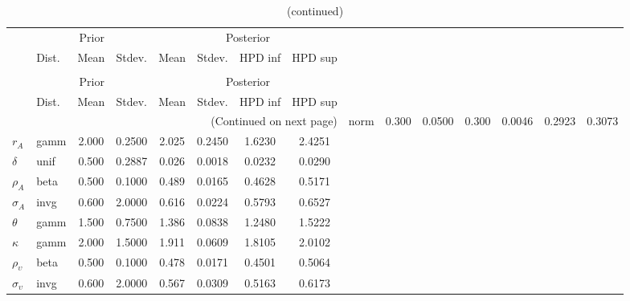  
\begin{center}
\begin{longtable}{llcccccc} 
\caption{Results from Metropolis-Hastings (parameters)}
 \label{Table:MHPosterior:1}\\
\toprule 
  & \multicolumn{3}{c}{Prior}  &  \multicolumn{4}{c}{Posterior} \\
  \cmidrule(r{.75em}){2-4} \cmidrule(r{.75em}){5-8}
  & Dist. & Mean  & Stdev. & Mean & Stdev. & HPD inf & HPD sup\\
\midrule \endfirsthead 
\caption{(continued)}\\\toprule 
  & \multicolumn{3}{c}{Prior}  &  \multicolumn{4}{c}{Posterior} \\
  \cmidrule(r{.75em}){2-4} \cmidrule(r{.75em}){5-8}
  & Dist. & Mean  & Stdev. & Mean & Stdev. & HPD inf & HPD sup\\
\midrule \endhead 
\bottomrule \multicolumn{8}{r}{(Continued on next page)} \endfoot 
\bottomrule \endlastfoot 
${\alpha}$ & norm &   0.300 & 0.0500 &   0.300& 0.0046 &  0.2923 &  0.3073 \\ 
${r_{A}}$ & gamm &   2.000 & 0.2500 &   2.025& 0.2450 &  1.6230 &  2.4251 \\ 
${\delta}$ & unif &   0.500 & 0.2887 &   0.026& 0.0018 &  0.0232 &  0.0290 \\ 
${\rho_A}$ & beta &   0.500 & 0.1000 &   0.489& 0.0165 &  0.4628 &  0.5171 \\ 
${\sigma_A}$ & invg &   0.600 & 2.0000 &   0.616& 0.0224 &  0.5793 &  0.6527 \\ 
${\theta}$ & gamm &   1.500 & 0.7500 &   1.386& 0.0838 &  1.2480 &  1.5222 \\ 
${\kappa}$ & gamm &   2.000 & 1.5000 &   1.911& 0.0609 &  1.8105 &  2.0102 \\ 
${\rho_\upsilon}$ & beta &   0.500 & 0.1000 &   0.478& 0.0171 &  0.4501 &  0.5064 \\ 
${\sigma_\upsilon}$ & invg &   0.600 & 2.0000 &   0.567& 0.0309 &  0.5163 &  0.6173 \\ 
\end{longtable}
 \end{center}
